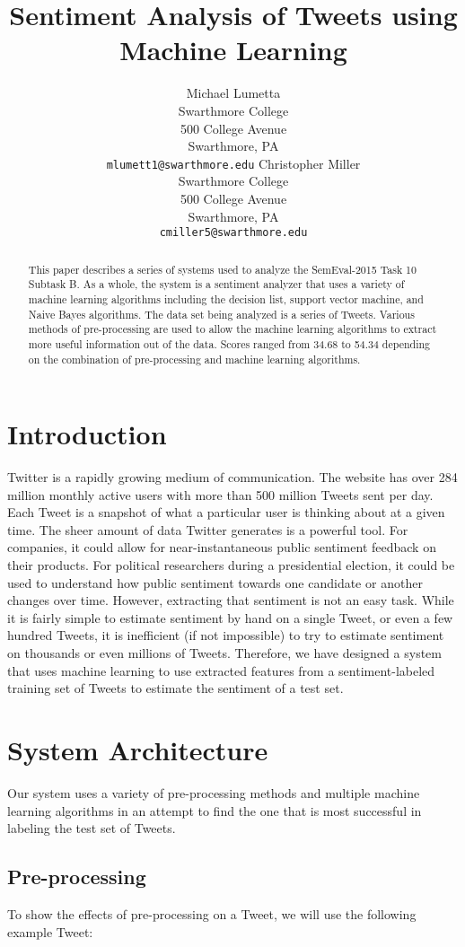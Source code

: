 \documentclass[11pt,letterpaper]{article}
\title{Sentiment Analysis of Tweets using Machine Learning}
\author{Michael Lumetta\\
	    Swarthmore College\\
	    500 College Avenue\\
	    Swarthmore, PA\\
	    {\tt mlumett1@swarthmore.edu}
	  \And
	Christopher Miller\\
  	Swarthmore College\\
  	500 College Avenue\\
  	Swarthmore, PA\\
  {\tt cmiller5@swarthmore.edu}}
\date{}
\begin{document}
\maketitle
\begin{abstract}
  This paper describes a series of systems used to analyze the SemEval-2015 Task 10 Subtask B. As a whole, the system is a sentiment analyzer that uses a variety of machine learning algorithms including the decision list, support vector machine, and Naive Bayes algorithms. The data set being analyzed is a series of Tweets. Various methods of pre-processing are used to allow the machine learning algorithms to extract more useful information out of the data. Scores ranged from 34.68 to 54.34 depending on the combination of pre-processing and machine learning algorithms. 
\end{abstract}

\section{Introduction}

Twitter is a rapidly growing medium of communication. The website has over 284 million monthly active users with more than 500 million Tweets sent per day. Each Tweet is a snapshot of what a particular user is thinking about at a given time. The sheer amount of data Twitter generates is a powerful tool. For companies, it could allow for near-instantaneous public sentiment feedback on their products. For political researchers during a presidential election, it could be used to understand how public sentiment towards one candidate or another changes over time. However, extracting that sentiment is not an easy task. While it is fairly simple to estimate sentiment by hand on a single Tweet, or even a few hundred Tweets, it is inefficient (if not impossible) to try to estimate sentiment on thousands or even millions of Tweets. Therefore, we have designed a system that uses machine learning to use extracted features from a sentiment-labeled training set of Tweets to estimate the sentiment of a test set. 

\section{System Architecture}
Our system uses a variety of pre-processing methods and multiple machine learning algorithms in an attempt to find the one that is most successful in labeling the test set of Tweets.
\subsection{Pre-processing}
To show the effects of pre-processing on a Tweet, we will use the following example Tweet: 
\end{document}
